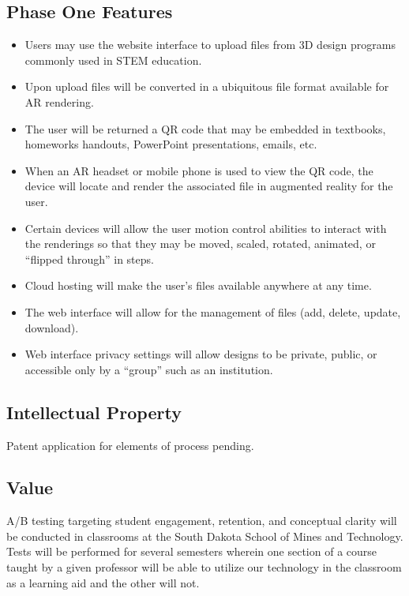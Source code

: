 \subsection{Phase One Features}
\begin{itemize}
	\item Users may use the website interface to upload files from 3D design programs commonly used in STEM education. 
	\item  Upon upload files will be converted in a ubiquitous file format available for AR rendering. 
	\item The user will be returned a QR code that may be embedded in textbooks, homeworks handouts, PowerPoint presentations, emails, etc. 
	\item When an AR headset or mobile phone is used to view the QR code, the device will locate and render the associated file in augmented reality for the user.  
	\item Certain devices will allow the user motion control abilities to interact with the renderings so that they may be moved, scaled, rotated, animated, or “flipped through” in steps. 
	\item Cloud hosting will make the user’s files available anywhere at any time. 
	\item The web interface will allow for the management of files (add, delete, update, download). 
	\item Web interface privacy settings will allow designs to be private, public, or accessible only by a “group” such as an institution. 
\end{itemize}

\subsection{Intellectual Property}
Patent application for elements of process pending. 

\subsection{Value} 
A/B testing targeting student engagement, retention, and conceptual clarity will be conducted in classrooms at the South Dakota School of Mines and Technology. Tests will be performed for several semesters wherein one section of a course taught by a given professor will be able to utilize our technology in the classroom as a learning aid and the other will not. 

